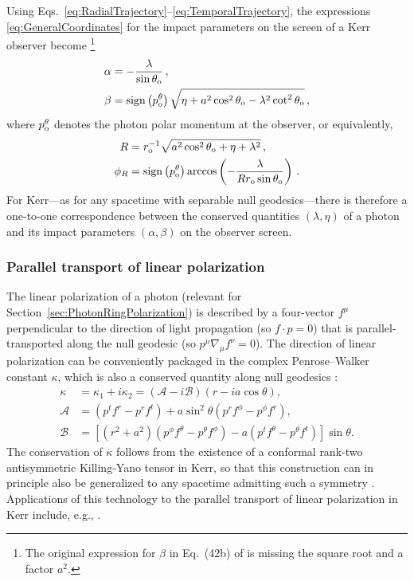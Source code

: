 \documentclass[graybox,envcountchap]{svmult}
\newcommand{\br}[1]{\left[#1\right]}
\newcommand{\pa}[1]{\left(#1\right)}
\DeclareMathOperator{\sign}{sign}
\begin{document}
Using Eqs.~\eqref{eq:RadialTrajectory}--\eqref{eq:TemporalTrajectory}, the expressions \eqref{eq:GeneralCoordinates} for the impact parameters on the screen of a Kerr observer become \cite{Bardeen1973,Chandrasekhar1992}\footnote{The original expression for $\beta$ in Eq.~(42b) of \cite{Bardeen1973} is missing the square root and a factor $a^2$.}
\begin{align}
    \label{eq:KerrAlpha}
    \alpha&=-\frac{\lambda}{\sin{\theta_{\rm o}}}\,,\\
    \label{eq:KerrBeta}
    \beta&=\sign\pa{p_{\rm o}^\theta}\sqrt{\eta+a^2\cos^2{\theta_{\rm o}}-\lambda^2\cot^2{\theta_{\rm o}}}\,,
\end{align}
where $p_{\rm o}^\theta$ denotes the photon polar momentum at the observer, or equivalently,
\begin{align}
    R&=r_{\rm o}^{-1}\sqrt{a^2\cos^2{\theta_{\rm o}}+\eta+\lambda^2}\,,\\
    \label{eq:KerrPhi}
    \phi_R&=\sign\pa{p_{\rm o}^\theta}\arccos\pa{-\frac{\lambda}{Rr_{\rm o}\sin{\theta_{\rm o}}}}\,. 
\end{align}
For Kerr---as for any spacetime with separable null geodesics---there is therefore a one-to-one correspondence between the conserved quantities $(\lambda,\eta)$ of a photon and its impact parameters $(\alpha,\beta)$ on the observer screen.

\subsubsection*{Parallel transport of linear polarization}

The linear polarization of a photon (relevant for Section~\ref{sec:PhotonRingPolarization}) is described by a four-vector $f^\mu$ perpendicular to the direction of light propagation (so $f\cdot p=0$) that is parallel-transported along the null geodesic (so $p^\mu\nabla_\mu f^\nu=0$).
The direction of linear polarization can be conveniently packaged in the complex Penrose--Walker constant $\kappa$, which is also a conserved quantity along null geodesics \cite{Connors1977,Connors1980}:
\begin{align} 
    \label{eq:PenroseWalker}
    \kappa&=\kappa_1+i\kappa_2
    =\pa{\mathcal{A}-i\mathcal{B}}\pa{r-ia\cos{\theta}},\\
    \mathcal{A}&=\pa{p^t f^r-p^r f^t}+a\sin^2{\theta}\pa{p^r f^\phi-p^\phi f^r},\\
    \mathcal{B}&=\br{\pa{r^2+a^2}\pa{p^\phi f^\theta-p^\theta f^\phi}-a\pa{p^t f^\theta-p^\theta f^t}}\sin{\theta}.
\end{align}
The conservation of $\kappa$ follows from the existence of a conformal rank-two antisymmetric Killing-Yano tensor in Kerr, so that this construction can in principle also be generalized to any spacetime admitting such a symmetry \cite{Chandrasekhar1992}.
Applications of this technology to the parallel transport of linear polarization in Kerr include, e.g., \cite{Li2009,Dexter2016,Lupsasca2018,Himwich2020,Narayan2021,Gelles2021}.
\end{document}
